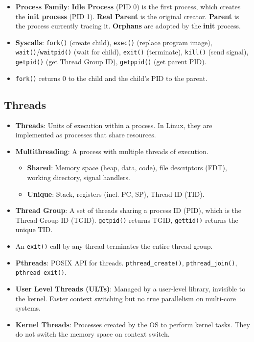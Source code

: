 \documentclass[8pt,a4paper]{article}
\begin{document}
\begin{multicols}{2}
\begin{itemize}
\begin{itemize}
    \end{itemize}
    \item \textbf{Process Family}: \textbf{Idle Process} (PID 0) is the first process, which creates the \textbf{init process} (PID 1). \textbf{Real Parent} is the original creator. \textbf{Parent} is the process currently tracing it. \textbf{Orphans} are adopted by the \textbf{init} process.
    \item \textbf{Syscalls}: \texttt{fork()} (create child), \texttt{exec()} (replace program image), \texttt{wait()}/\texttt{waitpid()} (wait for child), \texttt{exit()} (terminate), \texttt{kill()} (send signal), \texttt{getpid()} (get Thread Group ID), \texttt{getppid()} (get parent PID).
    \item \texttt{fork()} returns 0 to the child and the child's PID to the parent.
\end{itemize}

\subsection*{Threads}
\begin{itemize}
    \item \textbf{Threads}: Units of execution within a process. In Linux, they are implemented as processes that share resources.
    \item \textbf{Multithreading}: A process with multiple threads of execution.
    \begin{itemize}
        \item \textbf{Shared}: Memory space (heap, data, code), file descriptors (FDT), working directory, signal handlers.
        \item \textbf{Unique}: Stack, registers (incl. PC, SP), Thread ID (TID).
    \end{itemize}
    \item \textbf{Thread Group}: A set of threads sharing a process ID (PID), which is the Thread Group ID (TGID). \texttt{getpid()} returns TGID, \texttt{gettid()} returns the unique TID.
    \item An \texttt{exit()} call by any thread terminates the entire thread group.
    \item \textbf{Pthreads}: POSIX API for threads. \texttt{pthread\_create()}, \texttt{pthread\_join()}, \texttt{pthread\_exit()}.
    \item \textbf{User Level Threads (ULTs)}: Managed by a user-level library, invisible to the kernel. Faster context switching but no true parallelism on multi-core systems.
    \item \textbf{Kernel Threads}: Processes created by the OS to perform kernel tasks. They do not switch the memory space on context switch.
\end{itemize}


\end{multicols}
\end{document}
